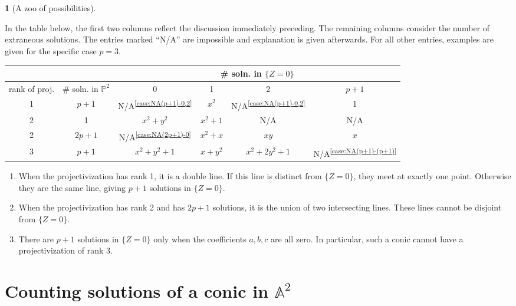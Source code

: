 \documentclass[10pt,a4paper]{amsart}
\numberwithin{equation}{section}
\numberwithin{figure}{section}
\theoremstyle{definition}
\newtheorem{example}{\protect\examplename}[section]
\theoremstyle{remark}
\theoremstyle{plain}
\theoremstyle{plain}
\theoremstyle{definition}
\theoremstyle{plain}
\theoremstyle{plain}
\providecommand{\examplename}{Example}
\newcommand{\A}{\mathbb{A}}
\begin{document}
	\begin{example}[A zoo of possibilities]
		\label{exa:all-possibilities}
		
		In the table below, the first two columns reflect the discussion
		immediately preceding. The remaining columns consider the number of extraneous
		solutions. The entries marked ``N/A'' are impossible and explanation is given
		afterwards. For all other entries, examples are given for the specific case
		$p=3$.  
		\begin{center} %
			\begin{tabular}{|c|c||c|c|c|c|} \hline \multicolumn{2}{|c||}{} &
				\multicolumn{4}{c|}{\# soln. in $\{Z=0\}$}  \\ \hline
				rank of proj. & \# soln. in $\mathbb{P}^2$ & 0 & 1 & 2 & $p + 1$\\
				\hline \hline
				1 & $p+1$ & N/A\textsuperscript{\ref{case:NA(p+1)-0,2}} & $x^2$ & N/A\textsuperscript{\ref{case:NA(p+1)-0,2}} & 1 \\
				\hline
				2 & 1 & $x^2 + y^2$ & $x^2 + 1$ & N/A & N/A \\
				\hline
				2 &	$2p+1$ & N/A\textsuperscript{\ref{case:NA(2p+1)-0}} & $x^2 + x$ & $xy$ & $x$ \\
				\hline
				3 & $p+1$ & $x^2 + y^2 + 1$ & $x+y^2$ & $x^2 + 2y^2 + 1$ & N/A\textsuperscript{\ref{case:NA(p+1)-(p+1)}} \\
				\hline
			\end{tabular}
		\end{center} 
		\begin{enumerate}
			\item\label{case:NA(p+1)-0,2} When the projectivization has rank 1, it is a double line. If this
			line is distinct from $\{Z = 0\}$, they meet at exactly one point. 
			Otherwise they are the same line, giving $p+1$ solutions in $\{Z=0\}$. 
			\item\label{case:NA(2p+1)-0} When the projectivization has rank 2 and has $2p + 1$ solutions, it
			is the union of two intersecting lines. These lines cannot be disjoint 
			from $\{Z=0\}$.
			\item\label{case:NA(p+1)-(p+1)} There are $p+1$ solutions in $\{Z = 0\}$ only when the 
			coefficients $a,b,c$ are all zero. In particular, such a conic cannot 
			have a projectivization of rank 3.
		\end{enumerate} 
	\end{example}

    \section{Counting solutions of a conic in $\A^2$}
    \label{sec:affine-solutions}
	
\end{document}
